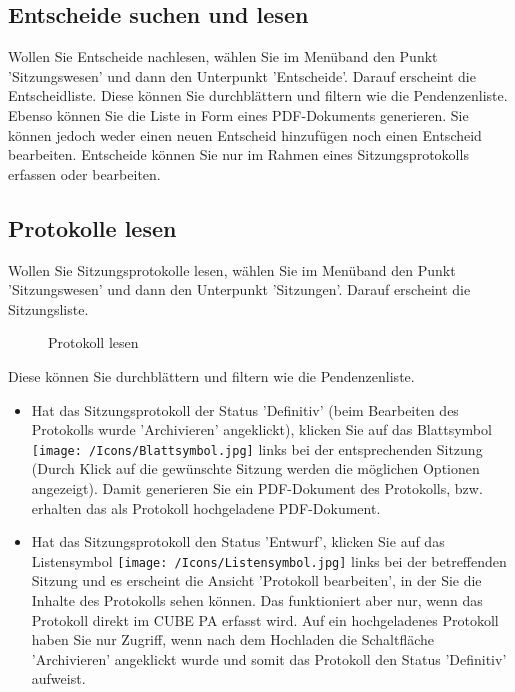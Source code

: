 \subsection{Entscheide suchen und lesen}

Wollen Sie Entscheide nachlesen, wählen Sie im Menüband den Punkt 'Sitzungswesen' und dann den Unterpunkt 'Entscheide'. Darauf erscheint die Entscheidliste. Diese können Sie durchblättern und filtern wie die Pendenzenliste. Ebenso können Sie die Liste in Form eines PDF-Dokuments generieren. Sie können jedoch weder einen neuen Entscheid hinzufügen noch einen Entscheid bearbeiten. Entscheide können Sie nur im Rahmen eines Sitzungsprotokolls erfassen oder bearbeiten.

\subsection{Protokolle lesen}

Wollen Sie Sitzungsprotokolle lesen, wählen Sie im Menüband den Punkt 'Sitzungswesen' und dann den Unterpunkt 'Sitzungen'. Darauf erscheint die Sitzungsliste.

\begin{figure}[H]
\caption{Protokoll lesen}
\end{figure}

Diese können Sie durchblättern und filtern wie die Pendenzenliste.

\begin{itemize}
\item
Hat das Sitzungsprotokoll der Status 'Definitiv' (beim Bearbeiten des Protokolls wurde 'Archivieren' angeklickt), klicken Sie auf das Blattsymbol \texttt{[image: /Icons/Blattsymbol.jpg]}  links bei der entsprechenden Sitzung (Durch Klick auf die gewünschte Sitzung werden die möglichen Optionen angezeigt). Damit generieren Sie ein PDF-Dokument des Protokolls, bzw. erhalten das als Protokoll hochgeladene PDF-Dokument.
\item
Hat das Sitzungsprotokoll den Status 'Entwurf', klicken Sie auf das Listensymbol \texttt{[image: /Icons/Listensymbol.jpg]}  links bei der betreffenden Sitzung und es erscheint die Ansicht 'Protokoll bearbeiten', in der Sie die Inhalte des Protokolls sehen können. Das funktioniert aber nur, wenn das Protokoll direkt im CUBE PA erfasst wird. Auf ein hochgeladenes Protokoll haben Sie nur Zugriff, wenn nach dem Hochladen die Schaltfläche 'Archivieren' angeklickt wurde und somit das Protokoll den Status 'Definitiv' aufweist.
\end{itemize}
